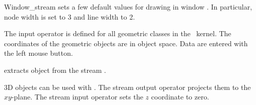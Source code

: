 \begin{ccRefClass} {Window_stream}
{sets a few default values for drawing in window . In particular, node width is
set to 3 and line width to 2.}


The input operator is defined for all geometric classes in the \cgal\ kernel.
The coordinates of the geometric objects are in object space. Data are
entered with the left mouse button.

       {extracts object  from the stream \ccVar.}


3D objects can be used with . The stream output
operator \ccc{<<} projects them to the $xy$-plane. The stream input
operator \ccc{>>} sets the $z$ coordinate to zero.


\end{ccRefClass} 
